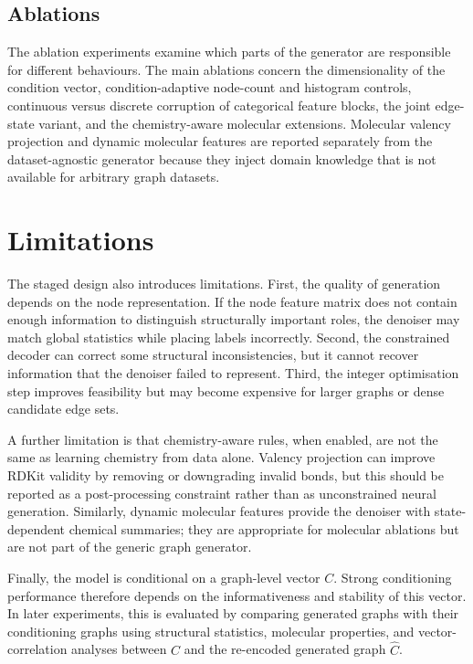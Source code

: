 \subsection{Ablations}

The ablation experiments examine which parts of the generator are responsible
for different behaviours. The main ablations concern the dimensionality of the
condition vector, condition-adaptive node-count and histogram controls,
continuous versus discrete corruption of categorical feature blocks, the joint
edge-state variant, and the chemistry-aware molecular extensions. Molecular
valency projection and dynamic molecular features are reported separately from
the dataset-agnostic generator because they inject domain knowledge that is not
available for arbitrary graph datasets.

\section{Limitations}
\label{sec:generator:limitations}

The staged design also introduces limitations. First, the quality of generation
depends on the node representation. If the node feature matrix does not contain enough
information to distinguish structurally important roles, the denoiser may match
global statistics while placing labels incorrectly. Second, the constrained
decoder can correct some structural inconsistencies, but it cannot recover
information that the denoiser failed to represent. Third, the integer
optimisation step improves feasibility but may become expensive for larger
graphs or dense candidate edge sets.

A further limitation is that chemistry-aware rules, when enabled, are not the
same as learning chemistry from data alone. Valency projection can improve
RDKit validity by removing or downgrading invalid bonds, but this should be
reported as a post-processing constraint rather than as unconstrained neural
generation. Similarly, dynamic molecular features provide the denoiser with
state-dependent chemical summaries; they are appropriate for molecular
ablations but are not part of the generic graph generator.

Finally, the model is conditional on a graph-level vector \(C\). Strong
conditioning performance therefore depends on the informativeness and stability
of this vector. In later experiments, this is evaluated by comparing generated
graphs with their conditioning graphs using structural statistics, molecular
properties, and vector-correlation analyses between \(C\) and the re-encoded
generated graph \(\hat{C}\).

